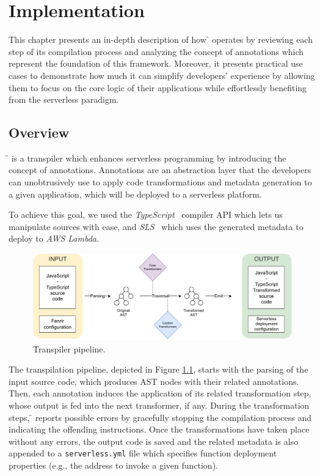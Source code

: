 \chapter{Implementation}
\label{chap:implementation}

This chapter presents an in-depth description of how \f{} operates
by reviewing each step of its compilation process and analyzing
the concept of annotations which represent the foundation of this framework.
Moreover, it presents practical use cases to demonstrate
how much it can simplify developers' experience
by allowing them to focus on the core logic of their applications
while effortlessly benefiting from the serverless paradigm.

\section{Overview}

\f{} is a transpiler which enhances serverless programming by introducing the concept of annotations.
Annotations are an abstraction layer that the developers can unobtrusively use
to apply code transformations and metadata generation to a given application,
which will be deployed to a serverless platform.

To achieve this goal, we used the \textit{TypeScript}~\cite{ts} compiler API which lets us
manipulate sources with ease, and \textit{SLS}~\cite{sls} which
uses the generated metadata to deploy to \textit{AWS Lambda}.

\begin{figure}[H]
  \centering
  \includegraphics[width=\textwidth]{diagrams/pipeline}
  \caption{Transpiler pipeline.}
  \label{fig:pipeline}
\end{figure}

The transpilation pipeline, depicted in Figure \ref{fig:pipeline},
starts with the parsing of the input source code, which produces AST nodes with their related
annotations. Then, each annotation induces the application of its related
transformation step, whose output is fed into the next transformer, if any.
During the transformation steps, \f{} reports possible errors by gracefully
stopping the compilation process and indicating the offending instructions. Once
the transformations have taken place without any errors, the output code is saved
and the related metadata is also appended to a
\verb|serverless.yml| file which specifies function deployment
properties (e.g., the address to invoke a given function).

